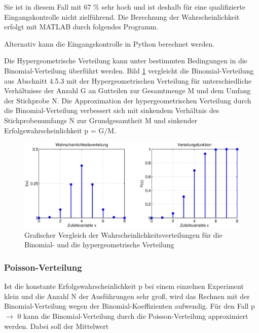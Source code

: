 \noindent Sie ist in diesem Fall mit 67 \% sehr hoch und ist deshalb f\"{u}r eine qualifizierte Eingangskontrolle nicht zielf\"{u}hrend. Die Berechnung der Wahrscheinlichkeit erfolgt mit MATLAB durch folgendes Programm.




\noindent Alternativ kann die Eingangskontrolle in Python berechnet werden.



\noindent Die Hypergeometrische Verteilung kann unter bestimmten Bedingungen in die Binomial-Verteilung \"{u}berf\"{u}hrt werden. Bild \ref{fig:Diskret_Hypergeometrisch2} vergleicht die Binomial-Verteilung aus Abschnitt 4.5.3 mit der Hypergeometrischen Verteilung f\"{u}r unterschiedliche Verh\"{a}ltnisse der Anzahl G an Gutteilen zur Gesamtmenge M und dem Umfang der Stichprobe N. Die Approximation der hypergeometrischen Verteilung durch die Binomial-Verteilung verbessert sich mit sinkendem Verh\"{a}ltnis des Stichprobenumfangs N zur Grundgesamtheit M und sinkender Erfolgswahrscheinlichkeit p = G/M.

\noindent 
\begin{figure}[H]
  \centerline{\includegraphics[width=1\textwidth]{Kapitel4/Bilder/image15}}
  \caption{Grafischer Vergleich der Wahrscheinlichkeitsverteilungen f\"{u}r die Binomial- und die hypergeometrische Verteilung}
  \label{fig:Diskret_Hypergeometrisch2}
\end{figure}

\subsubsection{Poisson-Verteilung}

\noindent Ist die konstante Erfolgswahrscheinlichkeit p bei einem einzelnen Experiment klein und die Anzahl N der Ausf\"{u}hrungen sehr gro{\ss}, wird das Rechnen mit der Binomial-Verteilung wegen der Binomial-Koeffizienten aufwendig. F\"{u}r den Fall p $\rightarrow$ 0 kann die Binomial-Verteilung durch die Poisson-Verteilung approximiert werden. Dabei soll der Mittelwert 

